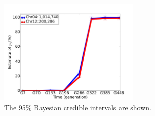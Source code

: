 \documentclass{bmcart}
\begin{document}
\begin{backmatter}
\clearpage
\begin{figure}[htbp]
\centering
\includegraphics[width=0.6\textwidth]{concomitant.png}
\caption{
The 95\% Bayesian credible intervals are shown.}
\end{figure}


\end{backmatter}
\end{document}
